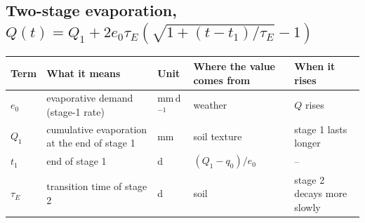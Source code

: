 \subsection*{Two-stage evaporation, $Q(t)=Q_1+2e_0\tau_E(\sqrt{1+(t-t_1)/\tau_E}-1)$}
{\small\begin{longtable}{>{\raggedright\arraybackslash}p{}>{\raggedright\arraybackslash}p{}>{\raggedright\arraybackslash}p{}>{\raggedright\arraybackslash}p{}>{\raggedright\arraybackslash}p{}}\toprule Term & What it means & Unit & Where the value comes from & When it rises\\\midrule\endhead
$e_0$ & evaporative demand (stage-1 rate) & mm\,d$^{-1}$ & weather & $Q$ rises\\
$Q_1$ & cumulative evaporation at the end of stage 1 & mm & soil texture & stage 1 lasts longer\\
$t_1$ & end of stage 1 & d & $(Q_1-q_0)/e_0$ & --\\
$\tau_E$ & transition time of stage 2 & d & soil & stage 2 decays more slowly\\
\bottomrule\end{longtable}}
